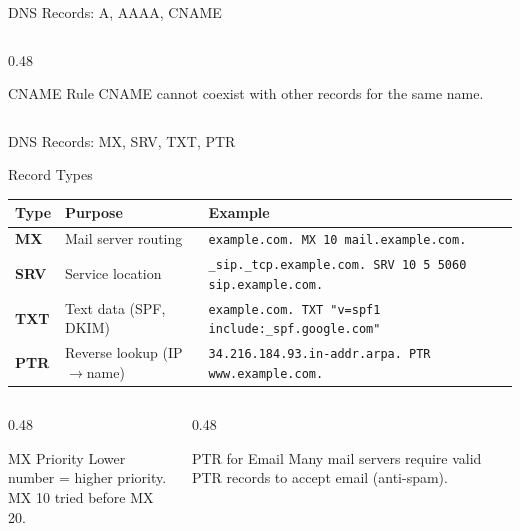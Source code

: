 \documentclass[aspectratio=169]{beamer}  %
\begin{document}
\begin{frame}{DNS Records: A, AAAA, CNAME}
\begin{columns}[T]
\begin{column}{0.48\textwidth}
            \vspace{0.2em}
            \begin{exampleblock}{CNAME Rule}
                \small
                CNAME cannot coexist with other records for the same name.
            \end{exampleblock}
        \end{column}
    \end{columns}
\end{frame}

\begin{frame}{DNS Records: MX, SRV, TXT, PTR}
    \small
    \begin{block}{Record Types}
        \begin{tabular}{l l l}
            \toprule
            \textbf{Type} & \textbf{Purpose} & \textbf{Example} \\
            \midrule
            \textbf{MX} & Mail server routing & \texttt{example.com. MX 10 mail.example.com.} \\
            \textbf{SRV} & Service location & \texttt{\_sip.\_tcp.example.com. SRV 10 5 5060 sip.example.com.} \\
            \textbf{TXT} & Text data (SPF, DKIM) & \texttt{example.com. TXT "v=spf1 include:\_spf.google.com"} \\
            \textbf{PTR} & Reverse lookup (IP$\rightarrow$name) & \texttt{34.216.184.93.in-addr.arpa. PTR www.example.com.} \\
            \bottomrule
        \end{tabular}
    \end{block}
    
    \vspace{0.2em}
    \begin{columns}[T]
        \begin{column}{0.48\textwidth}
            \begin{exampleblock}{MX Priority}
                \small
                Lower number = higher priority. \\
                MX 10 tried before MX 20.
            \end{exampleblock}
        \end{column}
        \begin{column}{0.48\textwidth}
            \begin{alertblock}{PTR for Email}
                \small
                Many mail servers require valid PTR records to accept email (anti-spam).
            \end{alertblock}
        \end{column}
    \end{columns}
\end{frame}
\end{document}

